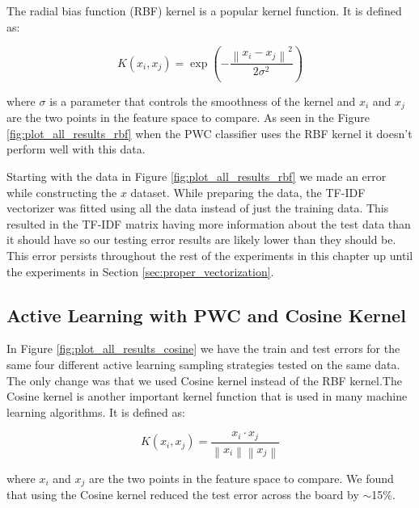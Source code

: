 The radial bias function (RBF) kernel is a popular kernel function. It is defined as:

\begin{equation}
    K(x_i, x_j) = \exp\left(- \frac{\left\| x_i - x_j \right\|^2}{2 \sigma^2}\right)
\label{eq:rbf_kernel}
\end{equation}

where $\sigma$ is a parameter that controls the smoothness of the kernel and $x_i$ and $x_j$ are the two points in the feature space to compare. As seen in the Figure \ref{fig:plot_all_results_rbf} when the PWC classifier uses the RBF kernel it doesn't perform well with this data.

Starting with the data in Figure \ref{fig:plot_all_results_rbf} we made an error while constructing the $x$ dataset. While preparing the data, the TF-IDF vectorizer was fitted using all the data instead of just the training data. This resulted in the TF-IDF matrix having more information about the test data than it should have so our testing error results are likely lower than they should be. This error persists throughout the rest of the experiments in this chapter up until the experiments in Section \ref{sec:proper_vectorization}.

\subsection{Active Learning with PWC and Cosine Kernel}

In Figure \ref{fig:plot_all_results_cosine} we have the train and test errors for the same four different active learning sampling strategies tested on the same data. The only change was that we used Cosine kernel instead of the RBF kernel.The Cosine kernel is another important kernel function that is used in many machine learning algorithms. It is defined as:

\begin{equation}
    K(x_i, x_j) = \frac{x_i \cdot x_j}{\left\| x_i \right\| \left\| x_j \right\|}
\label{eq:cosine_kernel}
\end{equation}

where $x_i$ and $x_j$ are the two points in the feature space to compare. We found that using the Cosine kernel reduced the test error across the board by $\sim$15\%.  

